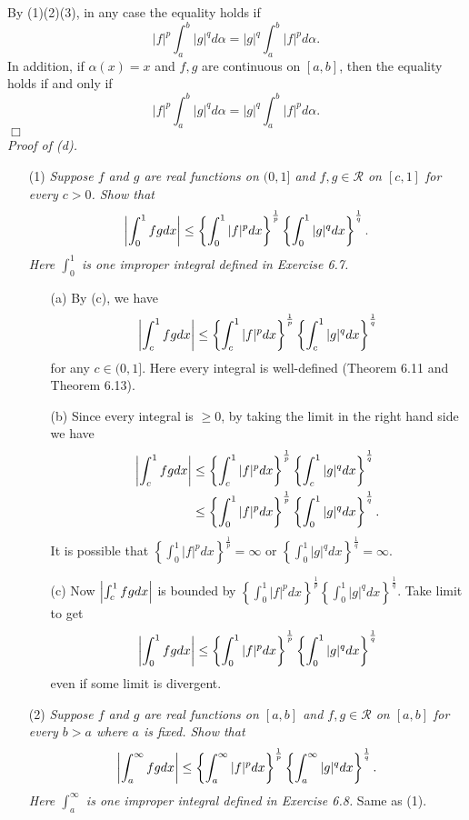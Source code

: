\documentclass{article}
\begin{document}
By (1)(2)(3),
in any case the equality holds if
\[
  |f|^p \int_{a}^{b} |g|^q d\alpha = |g|^q \int_{a}^{b} |f|^p d\alpha.
\]
In addition, if $\alpha(x) = x$ and $f, g$ are continuous on $[a,b]$,
then the equality holds if and only if
\[
  |f|^p \int_{a}^{b} |g|^q d\alpha = |g|^q \int_{a}^{b} |f|^p d\alpha.
\]
$\Box$ \\



\emph{Proof of (d).}
\begin{enumerate}
\item[(1)]
  \emph{Suppose $f$ and $g$ are real functions on $(0,1]$
  and $f, g \in \mathscr{R}$ on $[c,1]$ for every $c > 0$.
  Show that
  \[
    \abs{ \int_{0}^{1} fg dx }
    \leq
    \left\{ \int_{0}^{1} |f|^p dx \right\}^{\frac{1}{p}}
    \left\{ \int_{0}^{1} |g|^q dx \right\}^{\frac{1}{q}}.
  \]
  Here $\int_{0}^{1}$ is one improper integral defined in Exercise 6.7.}
  \begin{enumerate}
  \item[(a)]
    By (c), we have
    \[
      \abs{ \int_{c}^{1} fg dx }
      \leq
      \left\{ \int_{c}^{1} |f|^p dx \right\}^{\frac{1}{p}}
      \left\{ \int_{c}^{1} |g|^q dx \right\}^{\frac{1}{q}}
    \]
    for any $c \in (0,1]$.
    Here every integral is well-defined (Theorem 6.11 and Theorem 6.13).

  \item[(b)]
    Since every integral is $\geq 0$, by taking the limit in the right hand side
    we have
    \begin{align*}
      \abs{ \int_{c}^{1} fg dx }
      &\leq
      \left\{ \int_{c}^{1} |f|^p dx \right\}^{\frac{1}{p}}
      \left\{ \int_{c}^{1} |g|^q dx \right\}^{\frac{1}{q}} \\
      &\leq
      \left\{ \int_{0}^{1} |f|^p dx \right\}^{\frac{1}{p}}
      \left\{ \int_{0}^{1} |g|^q dx \right\}^{\frac{1}{q}}.
    \end{align*}
    It is possible that $\left\{ \int_{0}^{1} |f|^p dx \right\}^{\frac{1}{p}} = \infty$
    or $\left\{ \int_{0}^{1} |g|^q dx \right\}^{\frac{1}{q}} = \infty$.

  \item[(c)]
    Now $\abs{ \int_{c}^{1} fg dx }$ is bounded by
    $\left\{ \int_{0}^{1} |f|^p dx \right\}^{\frac{1}{p}}
    \left\{ \int_{0}^{1} |g|^q dx \right\}^{\frac{1}{q}}$.
    Take limit to get
    \[
      \abs{ \int_{0}^{1} fg dx }
      \leq
      \left\{ \int_{0}^{1} |f|^p dx \right\}^{\frac{1}{p}}
      \left\{ \int_{0}^{1} |g|^q dx \right\}^{\frac{1}{q}}
    \]
    even if some limit is divergent.
  \end{enumerate}

  \item[(2)]
  \emph{Suppose $f$ and $g$ are real functions on $[a,b]$
  and $f, g \in \mathscr{R}$ on $[a,b]$ for every $b > a$ where $a$ is fixed.
  Show that
  \[
    \abs{ \int_{a}^{\infty} fg dx }
    \leq
    \left\{ \int_{a}^{\infty} |f|^p dx \right\}^{\frac{1}{p}}
    \left\{ \int_{a}^{\infty} |g|^q dx \right\}^{\frac{1}{q}}.
  \]
  Here $\int_{a}^{\infty}$ is one improper integral defined in Exercise 6.8.}
  Same as (1).
\end{enumerate}
\end{document}
